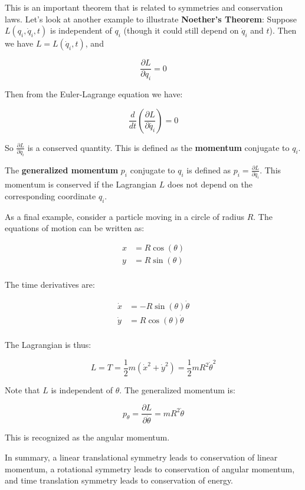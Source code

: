 This is an important theorem that is related to symmetries and conservation laws. Let's look at another example to illustrate \textbf{Noether's Theorem}: Suppose $L(q_i, \dot{q}_i, t)$ is independent of $q_i$ (though it could still depend on $\dot{q}_i$ and $t$). Then we have $L = L(\dot{q}_i, t)$, and

\begin{equation}
    \frac{\partial L}{\partial q_i} = 0
\end{equation}

Then from the Euler-Lagrange equation we have:

\begin{equation}
    \frac{d}{dt} \left(\frac{\partial L}{\partial \dot{q_i}}\right) = 0
\end{equation}

So $\frac{\partial L}{\partial \dot{q_i}}$ is a conserved quantity. This is defined as 
the \textbf{momentum} conjugate to $q_i$.

\begin{definition}
    The \textbf{generalized momentum} $p_i$ conjugate to $q_i$ is defined as $p_i = \frac{\partial L}{\partial \dot{q_i}}$.
    This momentum is conserved if the Lagrangian $L$ does not depend on the corresponding coordinate $q_i$.
\end{definition}

As a final example, consider a particle moving in a circle of radius $R$. The equations 
of motion can be written as:

\begin{align}
    x&=R\cos(\theta)\\
    y&=R\sin(\theta)\\
\end{align}

The time derivatives are:

\begin{align}
    \dot{x}&=-R\sin(\theta)\dot{\theta}\\
    \dot{y}&=R\cos(\theta)\dot{\theta}\\
\end{align}

The Lagrangian is thus:

\begin{equation}
    L = T = \frac{1}{2} m (\dot{x}^2+\dot{y}^2) = \frac{1}{2} m R^2 \dot{\theta}^2
\end{equation}

Note that $L$ is independent of $\theta$. The generalized momentum is:

\begin{equation}
    p_\theta =  \frac{\partial L}{\partial\dot{\theta}} = m R^2 \dot{\theta}
\end{equation}

This is recognized as the angular momentum.

In summary, a linear translational symmetry leads to conservation of linear momentum, a 
rotational symmetry leads to conservation of angular momentum, and time translation 
symmetry leads to conservation of energy.